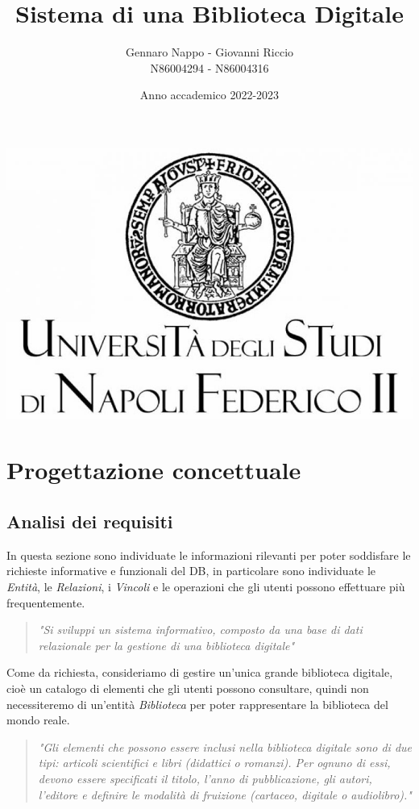 \documentclass{article}
\title{Sistema di una Biblioteca Digitale}
\author{Gennaro Nappo - Giovanni Riccio\\N86004294 - N86004316}
\date{Anno accademico 2022-2023}
\begin{document}
\maketitle
\includegraphics[width = 141mm]{images/Logo.jpg}

\newpage
\tableofcontents

\newpage
\section{Progettazione concettuale}

\subsection{Analisi dei requisiti}
In questa sezione sono individuate le informazioni rilevanti per poter soddisfare le richieste informative e funzionali del DB, in particolare sono individuate le \textit{Entità}, le \textit{Relazioni}, i \textit{Vincoli} e le operazioni che gli utenti possono effettuare più frequentemente.

\begin{quote}
\textit{"Si sviluppi un sistema informativo, composto da una base di dati relazionale per la gestione di una biblioteca digitale"}
\end{quote}

Come da richiesta, consideriamo di gestire un'unica grande biblioteca digitale, cioè un catalogo di elementi che gli utenti possono consultare, quindi non necessiteremo di un'entità \textit{Biblioteca} per poter rappresentare la biblioteca del mondo reale.

\begin{quote}
\textit{"Gli elementi che possono essere inclusi nella biblioteca digitale sono di due tipi: articoli scientifici e libri (didattici o romanzi). Per ognuno di essi, devono essere specificati il titolo, l’anno di pubblicazione, gli autori, l’editore e definire le modalità di fruizione (cartaceo, digitale o audiolibro)."}
\end{quote}
\end{document}
